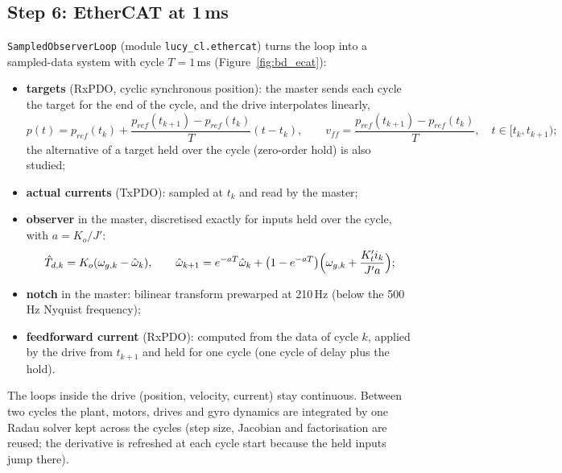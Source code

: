 \documentclass[10pt,a4paper]{article}
\numberwithin{equation}{section}
\begin{document}
\subsection{Step 6: EtherCAT at 1\,ms}
\texttt{SampledObserverLoop} (module \texttt{lucy\_cl.ethercat}) turns the loop into a sampled-data system with cycle $T=1$\,ms (Figure~\ref{fig:bd_ecat}):
\begin{itemize}
\item \textbf{targets} (RxPDO, cyclic synchronous position): the master sends each cycle the target for the end of the cycle, and the drive interpolates linearly,
\begin{equation}
p(t)=p_{ref}(t_k)+\frac{p_{ref}(t_{k+1})-p_{ref}(t_k)}{T}(t-t_k),\qquad v_{ff}=\frac{p_{ref}(t_{k+1})-p_{ref}(t_k)}{T},\quad t\in[t_k,t_{k+1});
\end{equation}
the alternative of a target held over the cycle (zero-order hold) is also studied;
\item \textbf{actual currents} (TxPDO): sampled at $t_k$ and read by the master;
\item \textbf{observer} in the master, discretised exactly for inputs held over the cycle, with $a=K_o/J'$:
\begin{equation}
\hat T_{d,k}=K_o(\omega_{g,k}-\hat\omega_k),\qquad \hat\omega_{k+1}=e^{-aT}\hat\omega_k+\bigl(1-e^{-aT}\bigr)\Bigl(\omega_{g,k}+\frac{K_t'i_k}{J'a}\Bigr);
\end{equation}
\item \textbf{notch} in the master: bilinear transform prewarped at 210\,Hz (below the 500\,Hz Nyquist frequency);
\item \textbf{feedforward current} (RxPDO): computed from the data of cycle $k$, applied by the drive from $t_{k+1}$ and held for one cycle (one cycle of delay plus the hold).
\end{itemize}
The loops inside the drive (position, velocity, current) stay continuous. Between two cycles the plant, motors, drives and gyro dynamics are integrated by one Radau solver kept across the cycles (step size, Jacobian and factorisation are reused; the derivative is refreshed at each cycle start because the held inputs jump there).
\end{document}
